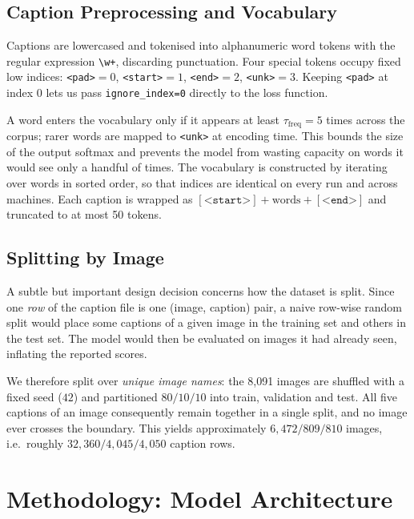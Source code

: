 \documentclass{article}
\begin{document}
\subsection{Caption Preprocessing and Vocabulary}

Captions are lowercased and tokenised into alphanumeric word tokens with the
regular expression \verb|\w+|, discarding punctuation. Four special tokens
occupy fixed low indices: \texttt{<pad>}$=0$, \texttt{<start>}$=1$,
\texttt{<end>}$=2$, \texttt{<unk>}$=3$. Keeping \texttt{<pad>} at index 0 lets us
pass \texttt{ignore\_index=0} directly to the loss function.

A word enters the vocabulary only if it appears at least
$\tau_{\text{freq}} = 5$ times across the corpus; rarer words are mapped to
\texttt{<unk>} at encoding time. This bounds the size of the output softmax and
prevents the model from wasting capacity on words it would see only a handful of
times. The vocabulary is constructed by iterating over words in sorted order, so
that indices are identical on every run and across machines. Each caption is
wrapped as $[\texttt{<start>}] + \text{words} + [\texttt{<end>}]$ and truncated
to at most 50 tokens.

\subsection{Splitting by Image}

A subtle but important design decision concerns how the dataset is split. Since
one \emph{row} of the caption file is one (image, caption) pair, a naive row-wise
random split would place some captions of a given image in the training set and
others in the test set. The model would then be evaluated on images it had
already seen, inflating the reported scores.

We therefore split over \emph{unique image names}: the 8{,}091 images are shuffled
with a fixed seed ($42$) and partitioned $80/10/10$ into train, validation and
test. All five captions of an image consequently remain together in a single
split, and no image ever crosses the boundary. This yields approximately
$6{,}472 / 809 / 810$ images, i.e.\ roughly $32{,}360 / 4{,}045 / 4{,}050$
caption rows.

\section{Methodology: Model Architecture}
\end{document}
